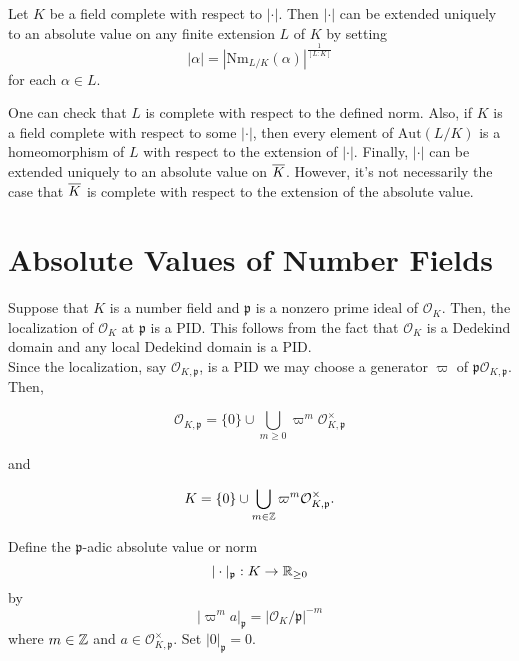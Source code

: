 \begin{theorem}
    Let $K$ be a field complete with respect to $|\cdot|$. Then $|\cdot|$ can be extended uniquely to an absolute value on any finite extension $L$ of $K$ by setting
        \[|\alpha| = \left| \textrm{Nm}_{L/K}(\alpha)\right|^{\frac{1}{[L:K]}}\]
    for each $\alpha \in L$.
\end{theorem}

One can check that $L$ is complete with respect to the defined norm. Also, if $K$ is a field complete with respect to some $|\cdot|$, then every element of $\textrm{Aut}(L/K)$ is a homeomorphism of $L$ with respect to the extension of $|\cdot|$. Finally, $|\cdot|$ can be extended uniquely to an absolute value on $\overline{K}$. However, it's not necessarily the case that $\overline{K}$ is complete with respect to the extension of the absolute value.

\section{Absolute Values of Number Fields}

Suppose that $K$ is a number field and $\mathfrak{p}$ is a nonzero prime ideal of $\mathcal{O}_{K}$. Then, the localization  
of $\mathcal{O}_{K}$ at $\mathfrak{p}$  is a PID. This follows from the fact that $\mathcal{O}_{K}$ is a Dedekind domain and any local Dedekind domain is a PID.\\

Since the localization, say $\mathcal{O}_{K,\mathfrak{p}}$, is a PID we may choose a generator $\varpi$ of $\mathfrak{p} \mathcal{O}_{K,\mathfrak{p}}$. Then,

\[\mathcal{O}_{K,\mathfrak{p}} = \{0\} \cup \bigcup_{m\geq 0} \varpi^m \mathcal{O}_{K,\mathfrak{p}}^\times\]

and 

\[K = \{0\} \cup \bigcup_{m\in \mathbb{Z}} \varpi^m \mathcal{O}_{K,\mathfrak{p}}^\times.\]

\begin{definition}
Define the $\mathfrak{p}$-adic absolute value or norm
    \[|\cdot|_\mathfrak{p}: K \to \mathbb{R}_{\geq 0}\]
by 
    \[|\varpi^m a|_\mathfrak{p} = |\mathcal{O}_{K}/\mathfrak{p}|^{-m}\]
where $m \in \mathbb{Z}$ and $a \in \mathcal{O}_{K,\mathfrak{p}}^\times$. Set $|0|_\mathfrak{p} = 0$.
\end{definition}

